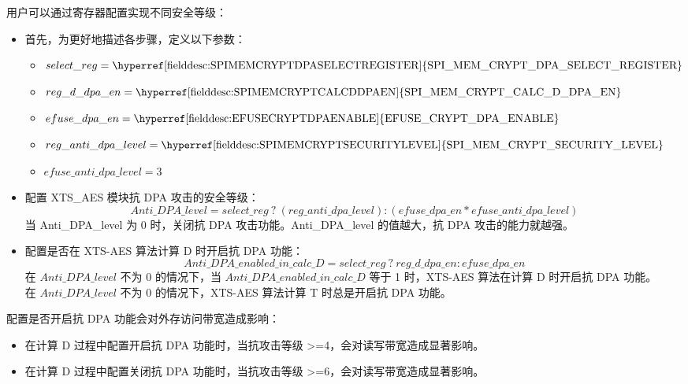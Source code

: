 \documentclass[main\_\_CN.tex]{subfiles}
\begin{document}
用户可以通过寄存器配置实现不同安全等级：
\begin{itemize}
    \item 首先，为更好地描述各步骤，定义以下参数：
    \begin{itemize}
        \item $select\_reg     = \textrm{\hyperref[fielddesc:SPIMEMCRYPTDPASELECTREGISTER]{SPI\_MEM\_CRYPT\_DPA\_SELECT\_REGISTER}}$
        \item $reg\_d\_dpa\_en = \textrm{\hyperref[fielddesc:SPIMEMCRYPTCALCDDPAEN]{SPI\_MEM\_CRYPT\_CALC\_D\_DPA\_EN}}$ 
        \item $efuse\_dpa\_en  = \textrm{\hyperref[fielddesc:EFUSECRYPTDPAENABLE]{EFUSE\_CRYPT\_DPA\_ENABLE}}$
        \item $reg\_anti\_dpa\_level = \textrm{\hyperref[fielddesc:SPIMEMCRYPTSECURITYLEVEL]{SPI\_MEM\_CRYPT\_SECURITY\_LEVEL}}$
        \item $efuse\_anti\_dpa\_level = \textrm{3}$
    \end{itemize}
    \item 配置 XTS\_AES 模块抗 DPA 攻击的安全等级：
    $$ Anti\_DPA\_level = select\_reg \ ?\  (reg\_anti\_dpa\_level) : (efuse\_dpa\_en * efuse\_anti\_dpa\_level) $$
    当 Anti\_DPA\_level 为 0 时，关闭抗 DPA 攻击功能。Anti\_DPA\_level 的值越大，抗 DPA 攻击的能力就越强。
    \item 配置是否在 XTS-AES 算法计算 D 时开启抗 DPA 功能：
    $$ Anti\_DPA\_enabled\_in\_calc\_D = select\_reg \ ? \ reg\_d\_dpa\_en : efuse\_dpa\_en $$
    在 $Anti\_DPA\_level$ 不为 0 的情况下，当 $ Anti\_DPA\_enabled\_in\_calc\_D $ 等于 1 时，XTS-AES 算法在计算 D 时开启抗 DPA 功能。\\
    在 $Anti\_DPA\_level$ 不为 0 的情况下，XTS-AES 算法计算 T 时总是开启抗 DPA 功能。
\end{itemize}
\vspace{-0.5em}

\begin{tiplisting}
配置是否开启抗 DPA 功能会对外存访问带宽造成影响：
\vspace{-0.5em}
\begin{itemize}
    \item 在计算 D 过程中配置开启抗 DPA 功能时，当抗攻击等级 >=4，会对读写带宽造成显著影响。
    \item 在计算 D 过程中配置关闭抗 DPA 功能时，当抗攻击等级 >=6，会对读写带宽造成显著影响。
\end{itemize}
\end{tiplisting}
\end{document}
